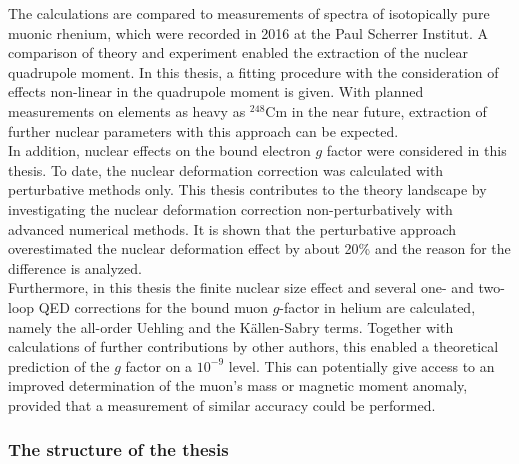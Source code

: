 The calculations are compared to measurements of spectra of isotopically pure muonic rhenium, which were recorded in 2016 at the Paul Scherrer Institut. A comparison of theory and experiment enabled the extraction of the nuclear quadrupole moment. In this thesis, a fitting procedure with the consideration of effects non-linear in the quadrupole moment is given.
With planned measurements on elements as heavy as $^{248}\text{Cm}$ in the near future, extraction of further nuclear parameters with this approach can be expected.\\[11pt]%
In addition, nuclear effects on the bound electron $g$ factor were considered in this thesis. To date, the nuclear deformation correction was calculated with perturbative methods only. This thesis contributes to the theory landscape by investigating the nuclear deformation correction non-perturbatively with advanced numerical methods. It is shown that the perturbative approach overestimated the nuclear deformation effect by about 20\% and the reason for the difference is analyzed.\\[11pt]%
Furthermore, in this thesis the finite nuclear size effect and several one- and two-loop QED corrections for the bound muon $g$-factor in helium are calculated, namely the all-order Uehling and the Källen-Sabry terms. Together with calculations of further contributions by other authors, this enabled a theoretical prediction of the $g$ factor on a $10^{-9}$ level. This can potentially give access to an improved determination of the muon's mass or magnetic moment anomaly, provided that a measurement of similar accuracy could be performed.


\subsubsection*{The structure of the thesis}

